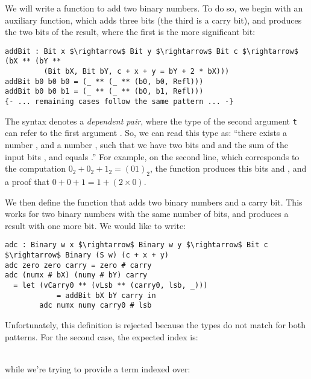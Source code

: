 We will write a function to add two binary numbers.
To do so, we begin with an auxiliary function, which adds three bits
(the third is a carry bit), and produces the two bits of
the result, where the first is the more significant bit:

\begin{lstlisting}
addBit : Bit x $\rightarrow$ Bit y $\rightarrow$ Bit c $\rightarrow$ (bX ** (bY ** 
         (Bit bX, Bit bY, c + x + y = bY + 2 * bX)))
addBit b0 b0 b0 = (_ ** (_ ** (b0, b0, Refl)))
addBit b0 b0 b1 = (_ ** (_ ** (b0, b1, Refl)))
{- ... remaining cases follow the same pattern ... -}
\end{lstlisting}

The syntax  denotes a \emph{dependent pair}, where the 
type of the second argument \texttt{t} can refer to the first argument
. So, we can read this type as: ``there exists a number ,
and a number , such that we have two bits  and
 and the sum of the input bits ,  and
 equals .''
For example, on the second line,
which corresponds to the computation $0_2 + 0_2 + 1_2 = (01)_2$,
the function produces this bits  and , and
a proof that $0 + 0 + 1 = 1 + (2 \times 0)$.

We then define the function  that adds two binary numbers and a carry
bit. This works for two binary numbers with the same number
of bits, and produces a result with one more bit. We would like to write:

\begin{lstlisting}
adc : Binary w x $\rightarrow$ Binary w y $\rightarrow$ Bit c $\rightarrow$ Binary (S w) (c + x + y)
adc zero zero carry = zero # carry
adc (numx # bX) (numy # bY) carry
  = let (vCarry0 ** (vLsb ** (carry0, lsb, _))) 
            = addBit bX bY carry in
        adc numx numy carry0 # lsb
\end{lstlisting}

Unfortunately, this definition is rejected because the types do
not match for both patterns.  
%
%
For the second case, the expected index is:

\\
while we're trying to provide a term indexed over:


